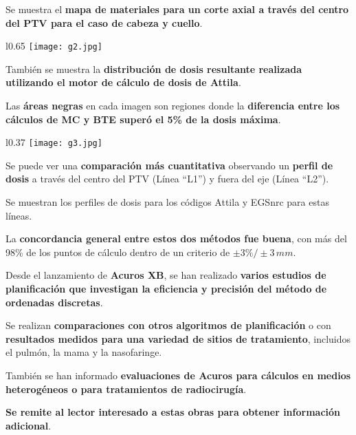 \documentclass[aspectratio=169,xcolor=dvipsnames,t]{beamer}
\begin{document}
\begin{frame}

    Se muestra el \textbf{mapa de materiales para un corte axial a través del centro del PTV para el caso de cabeza y cuello}.

    \begin{wrapfigure}{l}{0.65\textwidth}
        \centering
        \texttt{[image: g2.jpg]}
    \end{wrapfigure}

    También se muestra la \textbf{distribución de dosis resultante realizada utilizando el motor de cálculo de dosis de Attila}.

    Las \textbf{áreas negras} en cada imagen son regiones donde la \textbf{diferencia entre los cálculos de MC y BTE superó el 5\% de la dosis máxima}. 

\end{frame}

\begin{frame}

    \begin{wrapfigure}{l}{0.37\textwidth}
        \centering
        \texttt{[image: g3.jpg]}
    \end{wrapfigure}

    Se puede ver una \textbf{comparación más cuantitativa} observando un \textbf{perfil de dosis} a través del centro del PTV (Línea “L1”) y fuera del eje (Línea “L2”).

    Se muestran los perfiles de dosis para los códigos Attila y EGSnrc para estas líneas.

    La \textbf{concordancia general entre estos dos métodos fue buena}, con más del 98\% de los puntos de cálculo dentro de un criterio de $\pm 3\%/\pm3 \, mm$.

\end{frame}

\begin{frame}

    \vspace{1.5cm}

    Desde el lanzamiento de \textbf{Acuros XB}, se han realizado \textbf{varios estudios de planificación que investigan la eficiencia y precisión del método de ordenadas discretas}.

    Se realizan \textbf{comparaciones con otros algoritmos de planificación} o con \textbf{resultados medidos para una variedad de sitios de tratamiento}, incluidos el pulmón, la mama y la nasofaringe. 

    También se han informado \textbf{evaluaciones de Acuros para cálculos en medios heterogéneos o para tratamientos de radiocirugía}. 
    
    \textbf{Se remite al lector interesado a estas obras para obtener información adicional}.

\end{frame}


\End
\begin{frame}[standout,bg=white.png]
      \centering
      \printbibliography
\end{frame}
\end{document}
